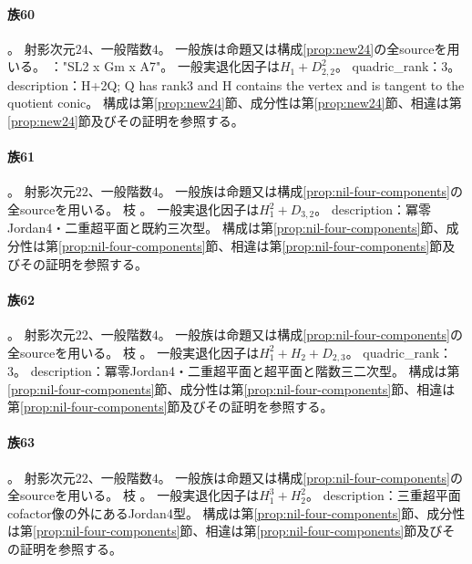\paragraph{族60}\label{catalogue:R4_DOUBLE_RANK3_QUADRIC_TWZERO_24}
。
射影次元$24$、一般階数$4$。
一般族は命題又は構成\ref{prop:new24}の全sourceを用いる。
："SL2 x Gm x A7"。
一般実退化因子は$H_{1}+D_{2,2}^{2}$。
quadric\_rank：3。
description：H+2Q; Q has rank3 and H contains the vertex and is tangent to the quotient conic。
構成は第\ref{prop:new24}節、成分性は第\ref{prop:new24}節、相違は第\ref{prop:new24}節及びその証明を参照する。

\paragraph{族61}\label{catalogue:R4_NIL4_DOUBLE_H_CUBIC_22}
。
射影次元$22$、一般階数$4$。
一般族は命題又は構成\ref{prop:nil-four-components}の全sourceを用いる。
枝 。
一般実退化因子は$H_{1}^{2}+D_{3,2}$。
description：冪零Jordan4・二重超平面と既約三次型。
構成は第\ref{prop:nil-four-components}節、成分性は第\ref{prop:nil-four-components}節、相違は第\ref{prop:nil-four-components}節及びその証明を参照する。

\paragraph{族62}\label{catalogue:R4_NIL4_DOUBLE_H_H_QUADRIC_22}
。
射影次元$22$、一般階数$4$。
一般族は命題又は構成\ref{prop:nil-four-components}の全sourceを用いる。
枝 。
一般実退化因子は$H_{1}^{2}+H_{2}+D_{2,3}$。
quadric\_rank：3。
description：冪零Jordan4・二重超平面と超平面と階数三二次型。
構成は第\ref{prop:nil-four-components}節、成分性は第\ref{prop:nil-four-components}節、相違は第\ref{prop:nil-four-components}節及びその証明を参照する。

\paragraph{族63}\label{catalogue:R4_NIL4_TRIPLE_H_DOUBLE_H_OUTSIDE_22}
。
射影次元$22$、一般階数$4$。
一般族は命題又は構成\ref{prop:nil-four-components}の全sourceを用いる。
枝 。
一般実退化因子は$H_{1}^{3}+H_{2}^{2}$。
description：三重超平面cofactor像の外にあるJordan4型。
構成は第\ref{prop:nil-four-components}節、成分性は第\ref{prop:nil-four-components}節、相違は第\ref{prop:nil-four-components}節及びその証明を参照する。

